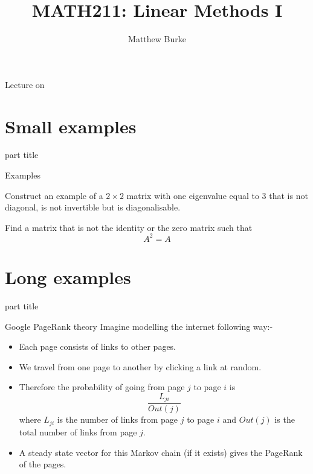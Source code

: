 \documentclass{beamer}
\title{MATH211: Linear Methods I}
\author{Matthew Burke}
\date{\lectureDate}
\newcommand{\lectureDate}{\formatdate{06}{12}{2018}}
\begin{document}
\frame{\titlepage}

\begin{frame}{Lecture on \lectureDate}
  \tableofcontents
\end{frame}

\section{Small examples}

\begin{frame}
\begin{beamercolorbox}[sep=12pt,center]{part title}
\insertsection\par
\end{beamercolorbox}
\end{frame}

\begin{frame}{Examples}
\begin{example}
	Construct an example of a $2\times 2$ matrix with one eigenvalue equal to $3$ that is not diagonal, is not invertible but is diagonalisable.
\end{example}
\begin{example}
	Find a matrix that is not the identity or the zero matrix such that
	\begin{equation*}
	A^2 = A
	\end{equation*}
\end{example}
\end{frame}

\section{Long examples}

\begin{frame}
\begin{beamercolorbox}[sep=12pt,center]{part title}
\insertsection\par
\end{beamercolorbox}
\end{frame}

\begin{frame}{Google PageRank theory}
Imagine modelling the internet following way:-
\begin{itemize}
	\item Each page consists of links to other pages.
	\item We travel from one page to another by clicking a link at random.
	\item Therefore the probability of going from page $j$ to page $i$ is 
	\begin{equation*}
	\frac{L_{ji}}{Out(j)}
	\end{equation*}
	where $L_{ji}$ is the number of links from page $j$ to page $i$ and $Out(j)$ is the total number of links from page $j$.
	\item A steady state vector for this Markov chain (if it exists) gives the PageRank of the pages.
\end{itemize}
\end{frame}
\end{document}
